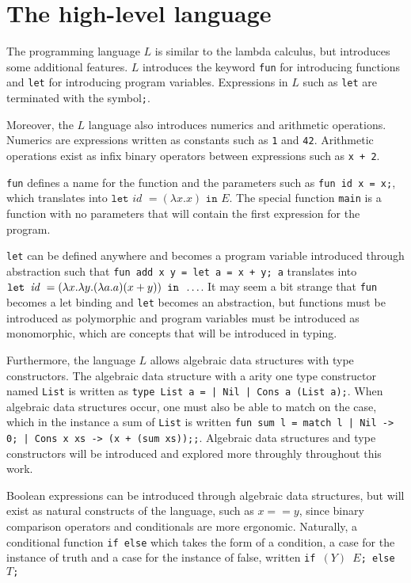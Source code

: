 \section{The high-level language}
The programming language $L$ is similar to the lambda calculus, but introduces some additional features.
$L$ introduces the keyword \texttt{fun} for introducing functions and \texttt{let} for introducing program variables.
Expressions in $L$ such as \texttt{let} are terminated with the symbol\texttt{;}.

Moreover, the $L$ language also introduces numerics and arithmetic operations.
Numerics are expressions written as constants such as \texttt{1} and \texttt{42}.
Arithmetic operations exist as infix binary operators between expressions such as \texttt{x + 2}.

\texttt{fun} defines a name for the function and the parameters such as \texttt{fun id x = x;}, which translates into $\texttt{let } \textit{id } = (\lambda x.x) \texttt{ in } E$.
The special function \texttt{main} is a function with no parameters that will contain the first expression for the program.

\texttt{let} can be defined anywhere and becomes a program variable introduced through abstraction such that \texttt{fun add x y = let a = x + y; a} translates into $\letexp{id}{(\lambda x. \lambda y. (\lambda a.a) (x + y))}{\dots}$.
It may seem a bit strange that \texttt{fun} becomes a let binding and \texttt{let} becomes an abstraction, but functions must be introduced as polymorphic and program variables must be introduced as monomorphic, which are concepts that will be introduced in typing.

Furthermore, the language $L$ allows algebraic data structures with type constructors.
The algebraic data structure with a arity one type constructor named \texttt{List} is written as \texttt{type List a = | Nil | Cons a (List a);}.
When algebraic data structures occur, one must also be able to match on the case, which in the instance a sum of \texttt{List} is written \texttt{fun sum l = match l | Nil -> 0; | Cons x xs -> (x + (sum xs));;}.
Algebraic data structures and type constructors will be introduced and explored more throughly throughout this work.

Boolean expressions can be introduced through algebraic data structures, but will exist as natural constructs of the language, such as \texttt{$x == y$}, since binary comparison operators and conditionals are more ergonomic.
Naturally, a conditional function \texttt{if else} which takes the form of a condition, a case for the instance of truth and a case for the instance of false, written \texttt{if $(Y)$ $E$; else $T$;}

